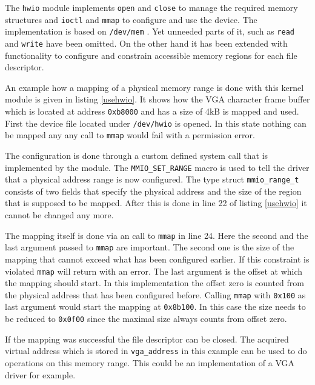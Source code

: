 \documentclass[
a4paper,
12pt,
notitlepage,
parskip=half,
DIV=11,
]{scrbook}
\begin{document}
		The \texttt{hwio} module implements \texttt{open} and \texttt{close} to manage the required memory structures and \texttt{ioctl} and \texttt{mmap} to configure and use the device.
		The implementation is based on \texttt{/dev/mem} \citep{devmem}.
		Yet unneeded parts of it, such as \texttt{read} and \texttt{write} have been omitted.
		On the other hand it has been extended with functionality to configure and constrain accessible memory regions for each file descriptor.
		
		
		An example how a mapping of a physical memory range is done with this kernel module is given in listing \ref{usehwio}.
		It shows how the VGA character frame buffer which is located at address \texttt{0xb8000} and has a size of 4kB is mapped and used.
		First the device file located under \texttt{/dev/hwio} is opened.
		In this state nothing can be mapped any any call to \texttt{mmap} would fail with a permission error.
		
		The configuration is done through a custom defined system call that is implemented by the module.
		The \texttt{MMIO\_SET\_RANGE} macro is used to tell the driver that a physical address range is now configured.
		The type struct \texttt{mmio\_range\_t} consists of two fields that specify the physical address and the size of the region that is supposed to be mapped.
		After this is done in line 22 of listing \ref{usehwio} it cannot be changed any more.
		
		The mapping itself is done via an call to \texttt{mmap} in line 24.
		Here the second and the last argument passed to \texttt{mmap} are important.
		The second one is the size of the mapping that cannot exceed what has been configured earlier.
		If this constraint is violated \texttt{mmap} will return with an error.
		The last argument is the offset at which the mapping should start.
		In this implementation the offset zero is counted from the physical address that has been configured before.
		Calling \texttt{mmap} with \texttt{0x100} as last argument would start the mapping at \texttt{0x8b100}.
		In this case the size needs to be reduced to \texttt{0x0f00} since the maximal size always counts from offset zero.
		
		If the mapping was successful the file descriptor can be closed.
		The acquired virtual address which is stored in \texttt{vga\_address} in this example can be used to do operations on this memory range.
		This could be an implementation of a VGA driver for example.
		
\end{document}
